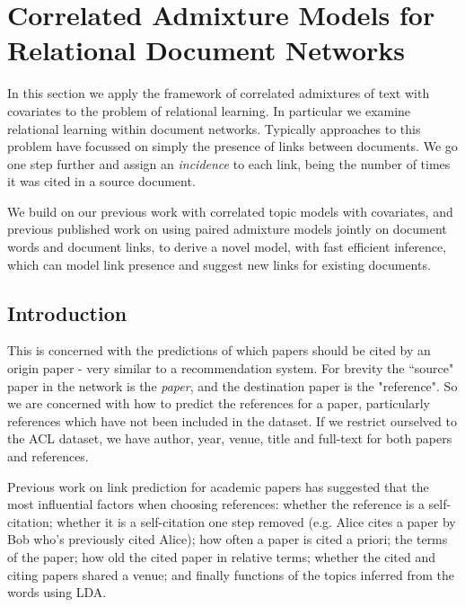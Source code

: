 

\newcommand \thdo { { \vv{\theta}_{d\cdot} } }
\newcommand \thok { { \vv{\theta}_{\cdot k} } }
\newcommand \phok { { \vv{\phi}_{\cdot k} } }
\newcommand \phdo { { \vv{\phi}_{d\cdot} } }

\chapter{Correlated Admixture Models for Relational Document Networks}
In this section we apply the framework of correlated admixtures of text with covariates to the problem of relational learning. In particular we examine relational learning within document networks. Typically approaches to this problem have focussed on simply the presence of links between documents. We go one step further and assign an \emph{incidence} to each link, being the number of times it was cited in a source document.

We build on our previous work with correlated topic models with covariates, and previous published work on using paired admixture models jointly on document words and document links, to derive a novel model, with fast efficient inference, which can model link presence and suggest new links for existing documents.
\section{Introduction}
This is concerned with the predictions of which papers should be cited by an origin paper - very similar to a recommendation system. For brevity the ``source" paper in the network is the \emph{paper}, and the destination paper is the "reference". So we are concerned with how to predict the references for a paper, particularly references which have not been included in the dataset. If we restrict ourselved to the ACL dataset, we have author, year, venue, title and full-text for both papers and references.

Previous work on link prediction for academic papers has suggested\cite{Bethard2010} that the most influential factors when choosing references: whether the reference is a self-citation; whether it is a self-citation one step removed (e.g. Alice cites a paper by Bob who's previously cited Alice); how often a paper is cited a priori; the terms of the paper; how old the cited paper in relative terms; whether the cited and citing papers shared a venue; and finally functions of the topics inferred from the words using LDA\cite{Blei2003}.

